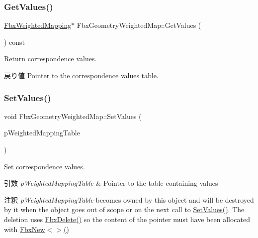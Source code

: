 \subsubsection{\texorpdfstring{Get\+Values()}{GetValues()}}
{\footnotesize\ttfamily \hyperlink{class_fbx_weighted_mapping}{Fbx\+Weighted\+Mapping}$\ast$ Fbx\+Geometry\+Weighted\+Map\+::\+Get\+Values (\begin{DoxyParamCaption}{ }\end{DoxyParamCaption}) const}

Return correspondence values. \begin{DoxyReturn}{戻り値}
Pointer to the correspondence values table. 
\end{DoxyReturn}
\mbox{\label{class_fbx_geometry_weighted_map_a42bb06040581c024f72d39e6a4318f4f}} 
\subsubsection{\texorpdfstring{Set\+Values()}{SetValues()}}
{\footnotesize\ttfamily void Fbx\+Geometry\+Weighted\+Map\+::\+Set\+Values (\begin{DoxyParamCaption}\item[{const \hyperlink{class_fbx_weighted_mapping}{Fbx\+Weighted\+Mapping} $\ast$}]{p\+Weighted\+Mapping\+Table }\end{DoxyParamCaption})}

Set correspondence values. 
\begin{DoxyParams}{引数}
{\em p\+Weighted\+Mapping\+Table} & Pointer to the table containing values \\
\hline
\end{DoxyParams}
\begin{DoxyRemark}{注釈}
{\itshape p\+Weighted\+Mapping\+Table} becomes owned by this object and will be destroyed by it when the object goes out of scope or on the next call to \hyperlink{class_fbx_geometry_weighted_map_a42bb06040581c024f72d39e6a4318f4f}{Set\+Values()}. The deletion uses \hyperlink{fbxalloc_8h_a55138f34ac93c519a78f624178c128d6}{Fbx\+Delete()} so the content of the pointer must have been allocated with \hyperlink{fbxnew_8h_a31302f981355f4b48ebc963ead1434f2}{Fbx\+New$<$$>$()} 
\end{DoxyRemark}



